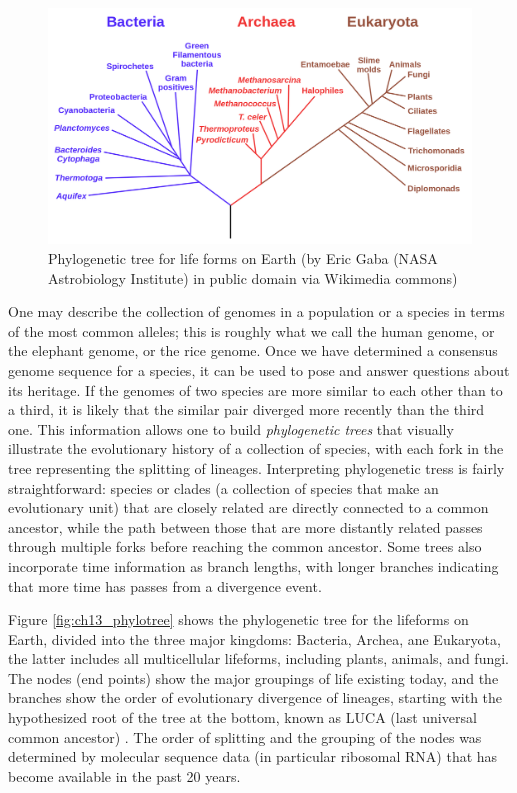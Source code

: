 \documentclass[
  letterpaper,
  DIV=11,
  numbers=noendperiod]{scrreprt}
\begin{document}
\begin{figure}

{\centering \includegraphics{./ch13/Phylogenetic_tree.png}

}

\caption{Phylogenetic tree for life forms on Earth (by Eric Gaba (NASA
Astrobiology Institute) in public domain via Wikimedia commons)}

\end{figure}

One may describe the collection of genomes in a population or a species
in terms of the most common alleles; this is roughly what we call the
human genome, or the elephant genome, or the rice genome. Once we have
determined a consensus genome sequence for a species, it can be used to
pose and answer questions about its heritage. If the genomes of two
species are more similar to each other than to a third, it is likely
that the similar pair diverged more recently than the third one. This
information allows one to build \emph{phylogenetic trees} that visually
illustrate the evolutionary history of a collection of species, with
each fork in the tree representing the splitting of lineages.
Interpreting phylogenetic tress is fairly straightforward: species or
clades (a collection of species that make an evolutionary unit) that are
closely related are directly connected to a common ancestor, while the
path between those that are more distantly related passes through
multiple forks before reaching the common ancestor. Some trees also
incorporate time information as branch lengths, with longer branches
indicating that more time has passes from a divergence event.

Figure \ref{fig:ch13_phylotree} shows the phylogenetic tree for the
lifeforms on Earth, divided into the three major kingdoms: Bacteria,
Archea, ane Eukaryota, the latter includes all multicellular lifeforms,
including plants, animals, and fungi. The nodes (end points) show the
major groupings of life existing today, and the branches show the order
of evolutionary divergence of lineages, starting with the hypothesized
root of the tree at the bottom, known as LUCA (last universal common
ancestor) \cite{futuyma_evolution_2009}. The order of splitting and the
grouping of the nodes was determined by molecular sequence data (in
particular ribosomal RNA) that has become available in the past 20
years.
\end{document}
